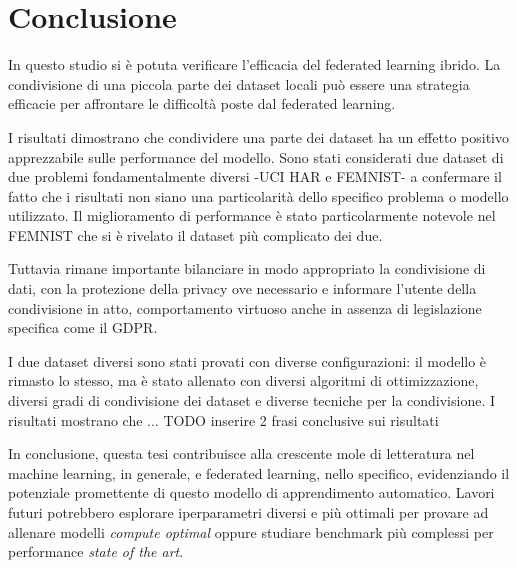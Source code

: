 \chapter{Conclusione}
In questo studio si è potuta verificare l'efficacia del 
federated learning ibrido. La condivisione di una piccola parte dei 
dataset locali può essere una strategia efficacie per affrontare le 
difficoltà poste dal federated learning.

I risultati dimostrano che condividere una parte dei dataset ha un 
effetto positivo apprezzabile sulle performance del modello. Sono stati 
considerati due dataset di due problemi fondamentalmente diversi -UCI HAR 
e FEMNIST- a confermare il fatto che i risultati non siano una particolarità
dello specifico problema o modello utilizzato. Il miglioramento di 
performance è stato particolarmente notevole nel FEMNIST che si è rivelato 
il dataset più complicato dei due. 

Tuttavia rimane importante bilanciare in modo appropriato la condivisione 
di dati, con la protezione della privacy ove necessario e informare 
l'utente della condivisione in atto, comportamento virtuoso anche in 
assenza di legislazione specifica come il GDPR.

I due dataset diversi sono stati provati con diverse configurazioni: il 
modello è rimasto lo stesso, ma è stato allenato con diversi algoritmi
di ottimizzazione, diversi gradi di condivisione dei dataset e diverse 
tecniche per la condivisione. I risultati mostrano che ...
TODO inserire 2 frasi conclusive sui risultati 

In conclusione, questa tesi contribuisce alla crescente mole di letteratura
nel machine learning, in generale, e federated learning, nello specifico, 
evidenziando il potenziale promettente di questo modello di apprendimento
automatico. Lavori futuri potrebbero esplorare iperparametri diversi e più
ottimali per provare ad allenare modelli \textit{compute optimal} oppure 
studiare benchmark più complessi per performance \textit{state of the art}.

